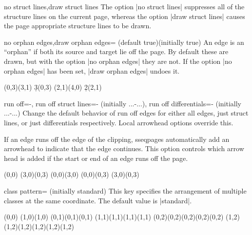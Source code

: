 \documentclass{ltxdoc}
\begin{document}
\begin{sseqdata}[name=ex1,degree={#1}{1-#1}]
\begin{keylist}{no struct lines,draw struct lines}
The option |no struct lines| suppresses all of the structure lines on the current page, whereas the option |draw struct lines| causes the page appropriate structure lines to be drawn.
\end{keylist}

\begin{keylist}{no orphan edges,draw orphan edges= (default true)(initially true)}
An edge is an ``orphan'' if both its source and target lie off the page. By default these are drawn, but with the option |no orphan edges| they are not. If the option |no orphan edges| has been set, |draw orphan edges| undoes it.
\begin{codeexample}[width=10cm]
\begin{sseqdata}[
    name=orphan edges example,
    cohomological Serre grading,
    x range={0}{2}, y range={0}{2}]
\class(0,3)\class(3,1)
\d3(0,3)
\class(2,1)\class(4,0)
\d2(2,1)
\end{sseqdata}
\printpage[name=orphan edges example]
\hskip1cm
\printpage[name=orphan edges example,
    no orphan edges]
\end{codeexample}
\end{keylist}

\begin{keylist}{run off=-,
    run off struct lines=-  (initially {...-...}),
    run off differentials=- (initially {...-...})}
Change the default behavior of run off edges for either all edges, just struct lines, or just differentials respectively. Local arrowhead options override this.

If an edge runs off the edge of the clipping, sseqpages automatically add an arrowhead to indicate that the edge continues. This option controls which arrow head is added if the start or end of an edge runs off the page.
\begin{codeexample}[]
\begin{sseqpage}[x range={0}{2},y range={0}{2},draw orphan edges,run off=>-stealth]
\class(0,0)
\class(3,0)\class(0,3)
\structline(0,0)(3,0)
\structline[red](0,0)(0,3)
\structline[blue](3,0)(0,3)
\end{sseqpage}
\end{codeexample}
\end{keylist}


\begin{key}{class pattern= (initially standard)}
This key specifies the arrangement of multiple classes at the same coordinate. The default value is |standard|.
\begin{codeexample}[]
\begin{sseqdata}[name=class pattern example,no axes,ymirror]
\class(0,0)
\class(1,0)\class(1,0)
\class(0,1)\class(0,1)\class(0,1)
\class(1,1)\class(1,1)\class(1,1)\class(1,1)
\class(0,2)\class(0,2)\class(0,2)\class(0,2)\class(0,2)
\class(1,2)\class(1,2)\class(1,2)\class(1,2)\class(1,2)\class(1,2)
\end{sseqdata}


\end{codeexample}
\end{key}
\end{sseqdata}
\end{document}
